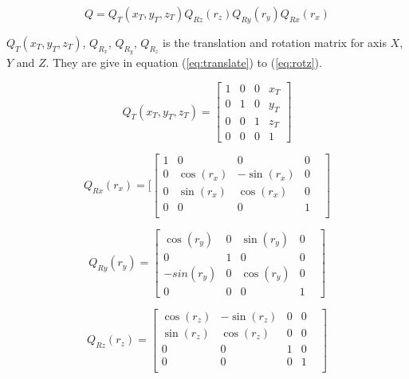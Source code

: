 \begin{equation}
Q=Q_T(x_T, y_T, z_T)Q_{Rz}(r_{z})Q_{Ry}(r_{y}) 
Q_{Rx}(r_{x})
\end{equation}

$Q_T(x_T, y_T, z_T)$, $Q_{R_x}$, $Q_{R_y}$, $Q_{R_z}$ is the
translation and rotation matrix for axis $X$, $Y$ and $Z$. They are
give in equation (\ref{eq:translate}) to (\ref{eq:rotz}). 

\begin{equation}
\label{eq:translate}
Q_T(x_T, y_T, z_T) = \begin{bmatrix}
1 & 0 & 0 & x_T \\
0 & 1 & 0 & y_T \\
0 & 0 & 1 & z_T \\
0 & 0 & 0 & 1 \end{bmatrix}
\end{equation}

\begin{equation}
\label{eq:rotx}
Q_{Rx}(r_{x})=\lbrack \begin{bmatrix}
1 & 0 & 0 & 0 & \\
0 & \cos (r_{x}) & -\sin (r_{x}) & 0 & \\
0 & \sin (r_{x}) & \cos (r_{x}) & 0 & \\
0 & 0 & 0 & 1 & \\
\end{bmatrix}
\end{equation}


\begin{equation}
\label{eq:roty}
Q_{Ry}(r_{y})= \begin{bmatrix}
\cos (r_{y}) & 0 & \sin (r_{y}) & 0 & \\
0 & 1 & 0 & 0 & \\
-sin(r_{y}) & 0 & \cos (r_{y}) & 0 & \\
0 & 0 & 0 & 1 & 
\end{bmatrix}
\end{equation}


\begin{equation}
\label{eq:rotz}
Q_{Rz}(r_{z})=\begin{bmatrix}
\cos (r_{z}) & -\sin (r_{z}) & 0 & 0 & \\
\sin (r_{z}) & \cos (r_{z}) & 0 & 0 & \\
0 & 0 & 1 & 0 & \\
0 & 0 & 0 & 1 & \\
\end{bmatrix}
\end{equation}

